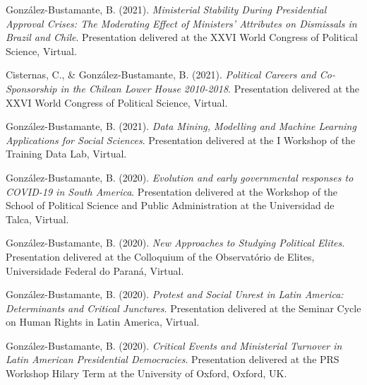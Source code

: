 \begin{publications}
\begin{benumerate}{66}
\item{\small González-Bustamante, B. (2021). {\itshape Ministerial Stability During Presidential Approval Crises: The Moderating Effect of Ministers' Attributes on Dismissals in Brazil and Chile}. Presentation delivered at the XXVI World Congress of Political Science, Virtual.}\vspace{1mm}

\item{\small Cisternas, C., \& González-Bustamante, B. (2021). {\itshape Political Careers and Co-Sponsorship in the Chilean Lower House 2010-2018}. Presentation delivered at the XXVI World Congress of Political Science, Virtual.}\vspace{1mm}

\item{\small González-Bustamante, B. (2021). {\itshape Data Mining, Modelling and Machine Learning Applications for Social Sciences}. Presentation delivered at the I Workshop of the Training Data Lab, Virtual.}\vspace{1mm}

\item{\small González-Bustamante, B. (2020). {\itshape Evolution and early governmental responses to COVID-19 in South America}. Presentation delivered at the Workshop of the School of Political Science and Public Administration at the Universidad de Talca, Virtual.}\vspace{1mm}

\item{\small González-Bustamante, B. (2020). {\itshape New Approaches to Studying Political Elites}. Presentation delivered at the Colloquium of the Observatório de Elites, Universidade Federal do Paraná, Virtual.}\vspace{1mm}

\item{\small González-Bustamante, B. (2020). {\itshape Protest and Social Unrest in Latin America: Determinants and Critical Junctures}. Presentation delivered at the Seminar Cycle on Human Rights in Latin America, Virtual.}\vspace{1mm} %

\item{\small González-Bustamante, B. (2020). {\itshape Critical Events and Ministerial Turnover in Latin American Presidential Democracies}. Presentation delivered at the PRS Workshop Hilary Term at the University of Oxford, Oxford, UK.}\vspace{1mm}


\end{benumerate}
\end{publications}
